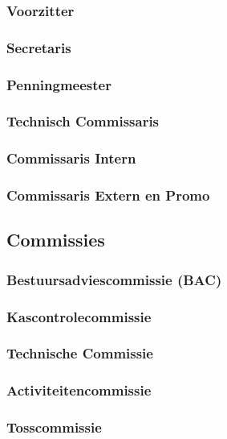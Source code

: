 \documentclass[]{article}
\begin{document}
\subsubsection{Voorzitter}

\subsubsection{Secretaris}

\subsubsection{Penningmeester}

\subsubsection{Technisch Commissaris}

\subsubsection{Commissaris Intern}

\subsubsection{Commissaris Extern en Promo}

\subsection{Commissies}
\subsubsection{Bestuursadviescommissie (BAC)}

\subsubsection{Kascontrolecommissie}

\subsubsection{Technische Commissie}

\subsubsection{Activiteitencommissie}

\subsubsection{Tosscommissie}
\end{document}
